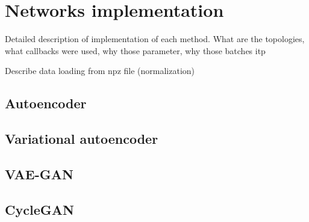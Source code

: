 \chapter{Networks implementation}
Detailed description of implementation of each method. What are the topologies, what callbacks were used, why those parameter, why those batches itp

Describe data loading from npz file (normalization)
\section{Autoencoder}
\section{Variational autoencoder}
\section{VAE-GAN}
\section{CycleGAN}